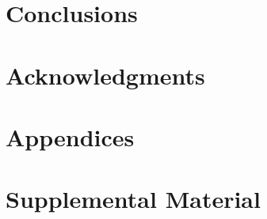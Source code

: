 \documentclass[11pt,a4paper]{article}
\begin{document}
\section{Conclusions}

\section*{Acknowledgments}




\appendix

\section{Appendices}
\label{sec:appendix}


\section{Supplemental Material}
\label{sec:supplemental}
\end{document}
